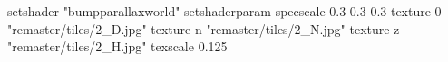 setshader "bumpparallaxworld"
setshaderparam specscale 0.3 0.3 0.3
    texture 0 "remaster/tiles/2_D.jpg"
    texture n "remaster/tiles/2_N.jpg"
    texture z "remaster/tiles/2_H.jpg"
    texscale 0.125